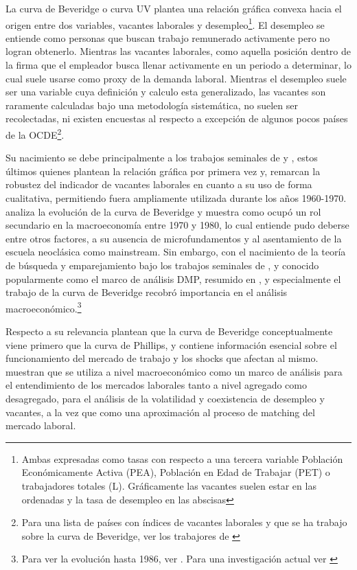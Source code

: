 \documentclass[msc,oneside,a4paper]{udelar} %
\begin{document}
  La curva de Beveridge o curva UV plantea una relación gráfica convexa hacia el origen entre dos variables, vacantes laborales y desempleo\footnote{Ambas expresadas como tasas con respecto a una tercera variable Población Económicamente Activa (PEA), Población en Edad de Trabajar (PET) o trabajadores totales (L). Gráficamente las vacantes suelen estar en las ordenadas y la tasa de desempleo en las abscisas}. El desempleo se entiende como personas que buscan trabajo remunerado activamente pero no logran obtenerlo. Mientras las vacantes laborales, como aquella posición dentro de la firma que el empleador busca llenar activamente en un periodo a determinar, lo cual suele usarse como proxy de la demanda laboral.
  Mientras el desempleo suele ser una variable cuya definición y calculo esta generalizado, las vacantes son raramente calculadas bajo una metodología sistemática, no suelen ser recolectadas, ni existen encuestas al respecto a excepción de algunos pocos países de la OCDE\footnote{Para una lista de países con índices de vacantes laborales y que se ha trabajo sobre la curva de Beveridge, ver los trabajores de \cite{Hobijn2013, Nickell2002}}.
  
  Su nacimiento se debe principalmente a los trabajos seminales de \cite{Beveridge} y \cite{Dicks-Mireaux1958}, estos últimos quienes plantean la relación gráfica por primera vez y, remarcan la robustez del indicador de vacantes laborales en cuanto a su uso de forma cualitativa, permitiendo fuera ampliamente utilizada durante los años 1960-1970. \cite{Rodenburg2007} analiza la evolución de la curva de Beveridge y muestra como ocupó un rol secundario en la macroeconomía entre 1970 y 1980, lo cual entiende pudo deberse entre otros factores, a su ausencia de microfundamentos y al asentamiento de la escuela neoclásica como mainstream. Sin embargo, con el nacimiento de la teoría de búsqueda y emparejamiento bajo los trabajos seminales de \cite{Pissarides1985}, \cite{Mortensen1994} y \cite{Diamond1982} conocido popularmente como el marco de análisis DMP, resumido en \cite{Pissarides2000}, y especialmente el trabajo de \cite{Blanchard1989} la curva de Beveridge recobró importancia en el análisis macroeconómico.\footnote{Para ver la evolución hasta 1986, ver \cite{Mortensen1986}. Para una investigación actual ver \cite{Elsby2015}}
  
  Respecto a su relevancia \cite{Blanchard1989} plantean que la curva de Beveridge conceptualmente viene primero que la curva de Phillips, y contiene información esencial sobre el funcionamiento del mercado de trabajo y los shocks que afectan al mismo. \cite{Elsby2015} muestran que se utiliza a nivel macroeconómico como un marco de análisis para el entendimiento de los mercados laborales tanto a nivel agregado como desagregado, para el análisis de la volatilidad y coexistencia de desempleo y vacantes, a la vez que como una aproximación al proceso de matching del mercado laboral.
  
\end{document}
